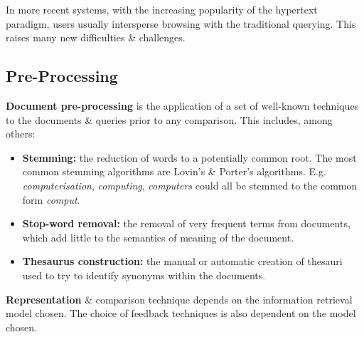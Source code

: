 \documentclass[a4paper,11pt]{article}
\begin{document}
In more recent systems, with the increasing popularity of the hypertext paradigm, users usually intersperse 
browsing with the traditional querying.
This raises many new difficulties \& challenges.

\subsection{Pre-Processing}
\textbf{Document pre-processing} is the application of a set of well-known techniques to the documents \& queries 
prior to any comparison.
This includes, among others:
\begin{itemize}
    \item   \textbf{Stemming:} the reduction of words to a potentially common root.
            The most common stemming algorithms are Lovin's \& Porter's algorithms.
            E.g. \textit{computerisation},
            \textit{computing}, \textit{computers} could all be stemmed to the common form \textit{comput}.
    \item   \textbf{Stop-word removal:} the removal of very frequent terms from documents, which add little to the 
            semantics of meaning of the document.
    \item   \textbf{Thesaurus construction:} the manual or automatic creation of thesauri used to try to identify 
            synonyms within the documents.
\end{itemize}

\textbf{Representation} \& comparison technique depends on the information retrieval model chosen.
The choice of feedback techniques is also dependent on the model chosen.
\end{document}

